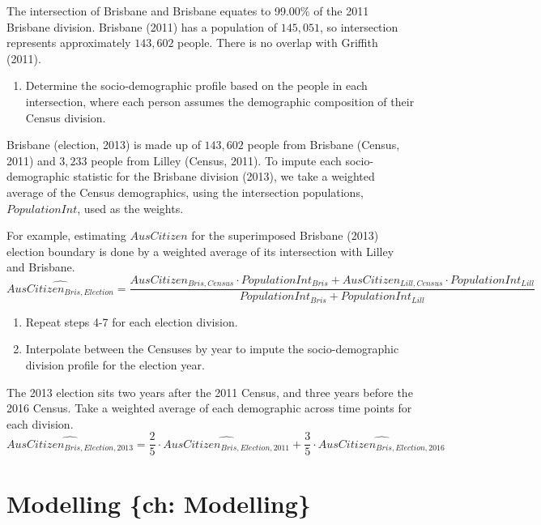 \documentclass{monashthesis}
\theoremstyle{definition}
\theoremstyle{definition}
\theoremstyle{definition}
\theoremstyle{remark}
\begin{document}
The intersection of Brisbane and Brisbane equates to 99.00\% of the 2011
Brisbane division. Brisbane (2011) has a population of \(145,051\), so
intersection represents approximately \(143,602\) people. There is no
overlap with Griffith (2011).

\begin{enumerate}
\def\labelenumi{\arabic{enumi}.}
\setcounter{enumi}{6}
\tightlist
\item
  Determine the socio-demographic profile based on the people in each
  intersection, where each person assumes the demographic composition of
  their Census division.
\end{enumerate}

Brisbane (election, 2013) is made up of \(143,602\) people from Brisbane
(Census, 2011) and \(3,233\) people from Lilley (Census, 2011). To
impute each socio-demographic statistic for the Brisbane division
(2013), we take a weighted average of the Census demographics, using the
intersection populations, \(PopulationInt\), used as the weights.

For example, estimating \(AusCitizen\) for the superimposed Brisbane
(2013) election boundary is done by a weighted average of its
intersection with Lilley and Brisbane.
\[\hat{AusCitizen_{Bris,Election}} = \frac{AusCitizen_{Bris,Census} \cdot PopulationInt_{Bris} + AusCitizen_{Lill,Census} \cdot PopulationInt_{Lill}}{PopulationInt_{Bris} + PopulationInt_{Lill}}\]

\begin{enumerate}
\def\labelenumi{\arabic{enumi}.}
\setcounter{enumi}{7}
\item
  Repeat steps 4-7 for each election division.
\item
  Interpolate between the Censuses by year to impute the
  socio-demographic division profile for the election year.
\end{enumerate}

The 2013 election sits two years after the 2011 Census, and three years
before the 2016 Census. Take a weighted average of each demographic
across time points for each division.
\[\hat{AusCitizen_{Bris,Election,2013}} = \frac{2}{5} \cdot \hat{AusCitizen_{Bris,Election,2011}} + \frac{3}{5} \cdot \hat{AusCitizen_{Bris,Election,2016}}\]

\chapter{Modelling \{ch: Modelling\}}\label{modelling-ch-modelling}
\end{document}

